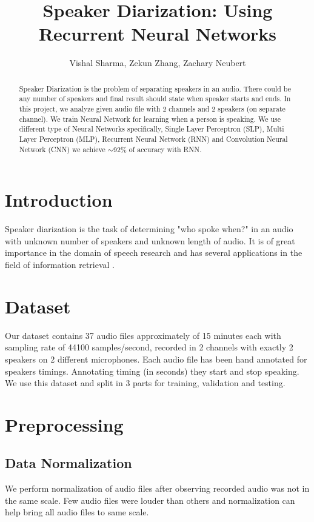 \documentclass[a4paper]{article}
\title{Speaker Diarization: Using Recurrent Neural Networks}
\author{Vishal Sharma, Zekun Zhang, Zachary Neubert}
\begin{document}
\maketitle

\begin{abstract}
Speaker Diarization is the problem of separating speakers in an audio. There could be any number of speakers and final result should state when speaker starts and ends. In this project, we analyze given audio file with 2 channels and 2 speakers (on separate channel). We train Neural Network for learning when a person is speaking. We use different type of Neural Networks specifically, Single Layer Perceptron (SLP), Multi Layer Perceptron (MLP), Recurrent Neural Network (RNN) and Convolution Neural Network (CNN) we achieve  $\sim$92\% of accuracy with RNN. 
\end{abstract}

\section{Introduction}

Speaker diarization is the task of determining "who spoke when?"\cite{anguera2010speaker} in an audio with unknown number of speakers and unknown length of audio. It is of great importance in the domain of speech research and has several applications in the field of information retrieval \cite{anguera2012speaker} \cite{pawelDeepRNN}.

\section{Dataset}
Our dataset contains 37 audio files approximately of 15 minutes each with sampling rate of 44100 samples/second, recorded in 2 channels with exactly 2 speakers on 2 different microphones. Each audio file has been hand annotated for speakers timings. Annotating timing (in seconds) they start and stop speaking. We use this dataset and split in 3 parts for training, validation and testing. 

\section{Preprocessing}

\subsection{Data Normalization}
We perform normalization of audio files after observing recorded audio was not in the same scale. Few audio files were louder than others and normalization can help bring all audio files to same scale.
\end{document}
